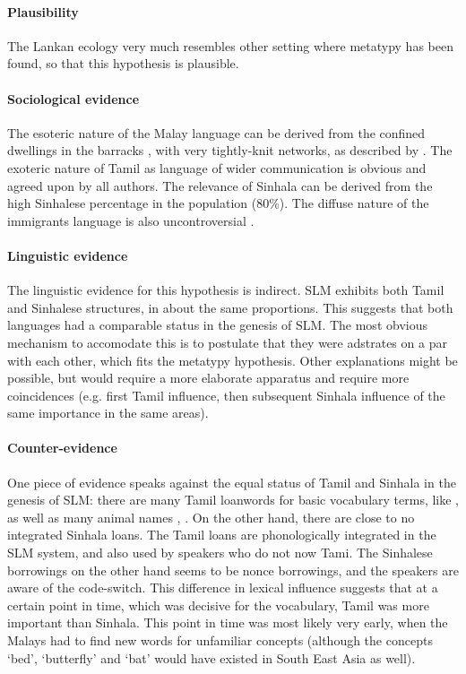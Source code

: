\paragraph{Plausibility}
The Lankan ecology very much resembles other setting where metatypy has been found, so that this hypothesis is plausible.

\paragraph{Sociological evidence}
The esoteric nature of the Malay language can be derived from the confined dwellings in the barracks \citep{abc}, with very tightly-knit networks, as described by \citep{Hussainmiya1990}. The exoteric nature of Tamil as language of wider communication is obvious and agreed upon by all authors. The relevance of Sinhala can be derived from the high Sinhalese percentage in the population (80\%). The diffuse nature of the immigrants language is also uncontroversial \citep[163]{SmithEtAl2007}\citep{abc}.

\paragraph{Linguistic evidence}
The linguistic evidence for this hypothesis is indirect. SLM exhibits both Tamil and Sinhalese structures, in about the same proportions. This suggests that both languages had a comparable status in the genesis of SLM. The most obvious mechanism to accomodate this is to postulate that they were adstrates on a par with each other, which fits the metatypy hypothesis. Other explanations might be possible, but would require a more elaborate apparatus and require more coincidences (e.g. first Tamil influence, then subsequent Sinhala influence of the same importance in the same areas).

\paragraph{Counter-evidence}
One piece of evidence speaks against the equal status of Tamil and Sinhala in the genesis of SLM: there are many Tamil loanwords for basic vocabulary terms, like , as well as many animal names , . On the other hand, there are close to no integrated Sinhala loans. The Tamil loans are phonologically integrated in the SLM system, and also used by speakers who do not now Tami. The Sinhalese borrowings on the other hand seems to be nonce borrowings, and the speakers are aware of the code-switch. This difference in lexical influence suggests that at a certain point in time, which was decisive for the vocabulary, Tamil was more important than Sinhala. This point in time was most likely very early, when the Malays had to find new words for unfamiliar concepts (although the concepts `bed',  `butterfly' and `bat' would have existed in South East Asia as well).

